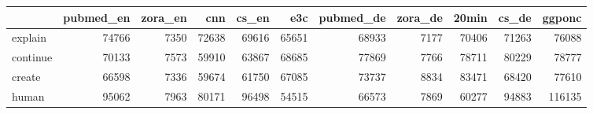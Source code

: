 \begin{tabular}{lrrrrrrrrrr}
\toprule
{} &  pubmed\_en &  zora\_en &    cnn &  cs\_en &    e3c &  pubmed\_de &  zora\_de &  20min &  cs\_de &  ggponc \\
\midrule
explain  &      74766 &     7350 &  72638 &  69616 &  65651 &      68933 &     7177 &  70406 &  71263 &   76088 \\
continue &      70133 &     7573 &  59910 &  63867 &  68685 &      77869 &     7766 &  78711 &  80229 &   78777 \\
create   &      66598 &     7336 &  59674 &  61750 &  67085 &      73737 &     8834 &  83471 &  68420 &   77610 \\
human    &      95062 &     7963 &  80171 &  96498 &  54515 &      66573 &     7869 &  60277 &  94883 &  116135 \\
\bottomrule
\end{tabular}
